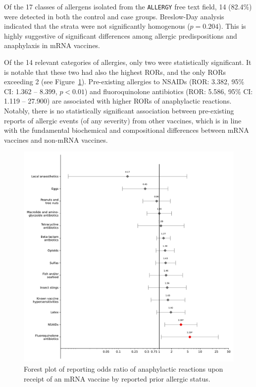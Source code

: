\documentclass{article}
\begin{document}
Of the 17 classes of allergens isolated from the \texttt{ALLERGY} free text field, 14 (82.4\%) were detected in both the control and case groups.
Breslow-Day analysis indicated that the strata were not significantly homogenous ($p = 0.204$).
This is highly suggestive of significant differences among allergic predispositions and anaphylaxis in mRNA vaccines.

Of the 14 relevant categories of allergies, only two were statistically significant.
It is notable that these two had also the highest RORs, and the only RORs exceeding 2 (see Figure~\ref{fig:allergies-forest-plot}).
Pre-existing allergies to NSAIDs (ROR: 3.382, 95\% CI: 1.362 -- 8.399, $p < 0.01$) and fluoroquinolone antibiotics (ROR: 5.586, 95\% CI: 1.119 -- 27.900) are associated with higher RORs of anaphylactic reactions.
Notably, there is no statistically significant association between pre-existing reports of allergic events (of any severity) from other vaccines, which is in line with the fundamental biochemical and compositional differences between mRNA vaccines and non-mRNA vaccines.


\begin{figure}
\centering
\includegraphics[width=12.5 cm]{forest_plot_of_anaphylaxis_by_known_allergies}
\caption{Forest plot of reporting odds ratio of anaphylactic reactions upon receipt of an mRNA vaccine by reported prior allergic status.}
\label{fig:allergies-forest-plot}
\end{figure}
\end{document}
